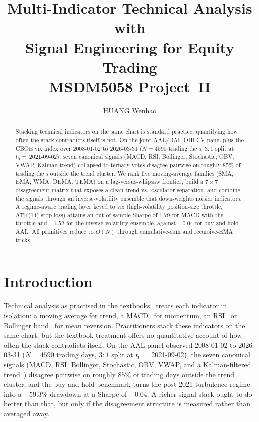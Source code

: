 \documentclass[runningheads]{llncs}
\title{Multi-Indicator Technical Analysis with\\
Signal Engineering for Equity Trading\\
\vspace{0.4em}
\large MSDM5058 Project~II}
\author{HUANG Wenhao}
\institute{HKUST -- Information Science MSc Programme\\
MSDM5058 Information Science -- Spring 2026}
\begin{document}
\maketitle
\thispagestyle{empty}
\newpage

\begin{abstract}
Stacking technical indicators on the same chart is standard practice;
quantifying how often the stack contradicts itself is not. On the
joint AAL/DAL OHLCV panel plus the CBOE \textsc{vix} index over
2008-01-02 to 2026-03-31 ($N{=}\num{4590}$ trading days, $3{:}1$ split
at $t_{0}{=}\,$2021-09-02), seven canonical signals (MACD, RSI,
Bollinger, Stochastic, OBV, VWAP, Kalman trend) collapsed to ternary
votes disagree pairwise on roughly $85\%$ of trading days outside the
trend cluster. We rank five moving-average families
(SMA, EMA, WMA, DEMA, TEMA) on a lag-versus-whipsaw frontier, build a
$7\!\times\!7$ disagreement matrix that exposes a clean trend-vs.\
oscillator separation, and combine the signals through an
inverse-volatility ensemble that down-weights noisier indicators. A
regime-aware trading layer keyed to \textsc{vix} (high-volatility
position-size throttle, ATR(14) stop loss) attains an out-of-sample
Sharpe of $\num{1.79}$ for MACD with the throttle and $\num{-1.52}$ for
the inverse-volatility ensemble, against $\num{-0.04}$ for buy-and-hold
AAL. All primitives reduce to $O(N)$ through cumulative-sum and
recursive-EMA tricks.
\end{abstract}
\newpage

\tableofcontents
\newpage

\section{Introduction}\label{sec:intro}
Technical analysis as practised in the textbooks~\cite{murphy1999}
treats each indicator in isolation: a moving average for trend, a
MACD~\cite{appel2005} for momentum, an RSI~\cite{wilder1978} or
Bollinger band~\cite{bollinger2001} for mean reversion. Practitioners
stack these indicators on the same chart, but the textbook treatment
offers no quantitative account of how often the stack contradicts
itself. On the AAL panel observed 2008-01-02 to 2026-03-31
($N{=}\num{4590}$ trading days, $3{:}1$ split at $t_{0}{=}\,$2021-09-02),
the seven canonical signals (MACD, RSI, Bollinger, Stochastic, OBV,
VWAP, and a Kalman-filtered trend~\cite{kalman1960}) disagree pairwise
on roughly $85\%$ of trading days outside the trend cluster, and the
buy-and-hold benchmark turns the post-2021 turbulence regime into a
$-59.3\%$ drawdown at a Sharpe of $-0.04$. A richer signal stack
ought to do better than that, but only if the disagreement structure
is measured rather than averaged away.
\end{document}
